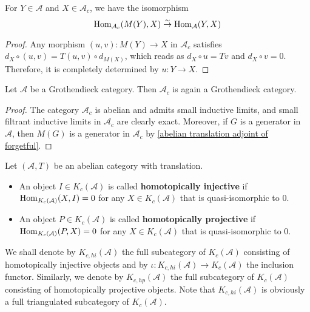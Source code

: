 \begin{lemma}\label{abelian translation adjoint of forgetful}
For $Y\in\mathcal{A}$ and $X\in\mathcal{A}_c$, we have the isomorphism
\[\mathrm{Hom}_{\mathcal{A}_c}(M(Y),X)\stackrel{\sim}{\to} \mathrm{Hom}_\mathcal{A}(Y,X)\]
\end{lemma}
\begin{proof}
Any morphism $(u,v):M(Y)\to X$ in $\mathcal{A}_c$ satisfies $d_X\circ (u,v)=T(u,v)\circ d_{M(X)}$, which reads as $d_X\circ u=Tv$ and $d_X\circ v=0$. Therefore, it is completely determined by $u:Y\to X$.
\end{proof}

\begin{proposition}\label{abelian translation complex cat is Grothendieck}
Let $\mathcal{A}$ be a Grothendieck category. Then $\mathcal{A}_c$ is again a Grothendieck category.
\end{proposition}
\begin{proof}
The category $\mathcal{A}_c$ is abelian and admits small inductive limits, and small filtrant inductive limits in $\mathcal{A}_c$ are clearly exact. Moreover, if $G$ is a generator in $\mathcal{A}$, then $M(G)$ is a generator in $\mathcal{A}_c$ by \cref{abelian translation adjoint of forgetful}.
\end{proof}

\begin{definition}
Let $(\mathcal{A},T)$ be an abelian category with translation.
\begin{itemize}
    \item An object $I\in K_c(\mathcal{A})$ is called \textbf{homotopically injective} if $\mathrm{Hom}_{K_c(\mathcal{A})}(X,I)=0$ for any $X\in K_c(\mathcal{A})$ that is quasi-isomorphic to $0$.
    \item An object $P\in K_c(\mathcal{A})$ is called \textbf{homotopically projective} if $\mathrm{Hom}_{K_c(\mathcal{A})}(P,X)=0$ for any $X\in K_c(\mathcal{A})$ that is quasi-isomorphic to $0$.
\end{itemize}
\end{definition}

We shall denote by $K_{c,hi}(\mathcal{A})$ the full subcategory of $K_c(\mathcal{A})$ consisting of homotopically injective objects and by $\iota:K_{c,hi}(\mathcal{A})\to K_c(\mathcal{A})$ the inclusion functor. Similarly, we denote by $K_{c,hp}(\mathcal{A})$ the full subcategory of $K_c(\mathcal{A})$ consisting of homotopically projective objects. Note that $K_{c,hi}(\mathcal{A})$ is obviously a full triangulated subcategory of $K_c(\mathcal{A})$.

